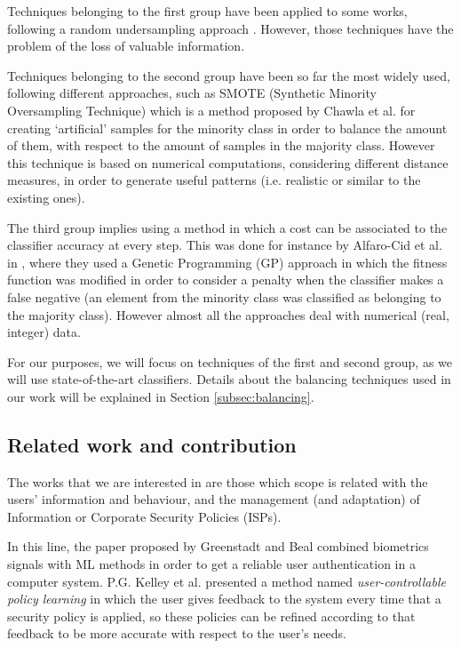 \documentclass{llncs}
\begin{document}
Techniques belonging to the first group have been applied to some works, following a random undersampling approach \cite{random_undersampling_08}. However, those techniques have the problem of the loss of valuable information. 

Techniques belonging to the second  group have been so far the most widely used, following different approaches, such as SMOTE (Synthetic Minority Oversampling Technique) \cite{smote_02} which is a method proposed by Chawla et al. for creating `artificial' samples for the minority class in order to balance the amount of them, with respect to the amount of samples in the majority class. However this technique is based on numerical computations, considering  different distance measures, in order to generate useful patterns  (i.e. realistic or similar to the existing ones).

The third group implies using a method in which a cost can be associated to the classifier accuracy at every step. This was done for instance by Alfaro-Cid et al. in \cite{cost_adjustment_07}, where they used a Genetic Programming (GP) approach in which the fitness function was modified in order to consider a penalty when the classifier makes a false negative (an element from the minority class was classified as belonging to the majority class).
However almost all the approaches deal with numerical (real, integer)
data. 

For our purposes, we will focus on techniques of the first and second group, as we will use state-of-the-art classifiers. Details about the balancing techniques used in our work will be explained in Section \ref{subsec:balancing}. 

%
\subsection{Related work and contribution}
\label{subsec:relatedworks}

The works that we are interested in are those which scope is related with the users' information and behaviour, and the management (and adaptation) of Information or Corporate Security Policies (ISPs).

In this line, the paper proposed by Greenstadt and Beal \cite{cognitive_security_08} combined biometrics signals with ML methods in order to get a reliable user authentication in a computer system. P.G. Kelley et al. \cite{user-controllable_learning_08} presented a method named \textit{user-controllable policy learning} in which the user gives feedback to the system every time that a security policy is applied, so these policies can be refined according to that feedback to be more accurate with respect to the user's needs. 
\end{document}
